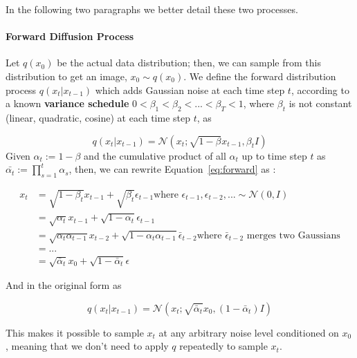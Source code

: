 \documentclass[preprint]{elsarticle}
\begin{document}
In the following two paragraphs we better detail these two processes.

\paragraph{Forward Diffusion Process} Let $q(x_0)$ be the actual data distribution; then, we can sample from this distribution to get an image, $x_0 \sim q(x_0)$. 
We define the forward distribution process $q(x_t|x_{t-1})$ which adds Gaussian noise at each time step $t$, 
according to a known \textbf{variance schedule} $0<\beta_1<\beta_2<...<\beta_T<1$, where $\beta_t$ 
is not constant (linear, quadratic, cosine) at each time step $t$,  as

\begin{equation} \label{eq:forward}
	q(x_t|x_{t-1}) = \mathcal{N}(x_t; \sqrt{1-\beta}x_{t-1}, \beta_t I)
\end{equation}
Given $\alpha_t:=1-\beta$ and the cumulative product of all $\alpha_t$ up to time step $t$ as 
$\bar{\alpha_t} := \prod_{s=1}^t\alpha_s$, then, we can rewrite Equation~\ref{eq:forward} as \cite{weng2021diffusion}:

\begin{equation}
	\begin{split}
		x_t & = \sqrt{1-\beta_t}x_{t-1} + \sqrt{\beta_t}\epsilon_{t-1}
		\text{where $\epsilon_{t-1},\epsilon_{t-2},... \sim \mathcal{N}(0,I)$}\\
		& = \sqrt{\alpha_t}x_{t-1} + \sqrt{1-\alpha_t}\epsilon_{t-1} \\
		& = \sqrt{\alpha_t\alpha_{t-1}}x_{t-2} + \sqrt{1-\alpha_t\alpha_{t-1}}\bar{\epsilon}_{t-2} 
		\text{where $\bar{\epsilon}_{t-2}$ merges two Gaussians}\\
		& = ... \\
		& = \sqrt{\bar{\alpha}_t}x_0 + \sqrt{1-\bar{\alpha}_t}\epsilon 
	\end{split}
\end{equation}

And in the original form as

\begin{equation} \label{eq:forward2}
	q(x_t|x_{t-1}) = \mathcal{N}(x_t; \sqrt{\bar{\alpha}_t}x_0, (1 -\bar{\alpha}_t) I)
\end{equation}

This makes it possible to sample $x_t$ at any arbitrary noise level conditioned on $x_0$,
meaning that we don't need to apply $q$ repeatedly to sample $x_t$.
\end{document}
